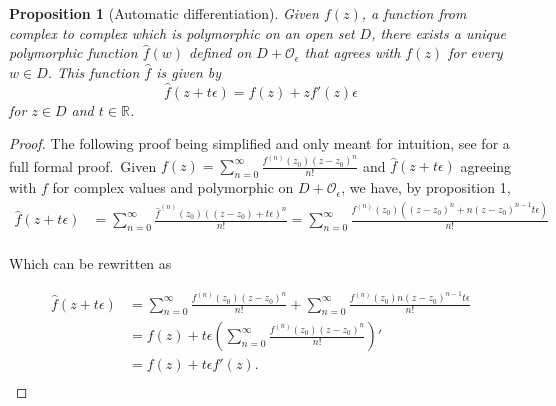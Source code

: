 \documentclass{article}
\newtheorem{proposition}[theorem]{Proposition}
\newcommand{\R}{\mathbb{R}}
\newcommand{\Z}{\mathcal{O}_\e}
\newcommand{\e}{\epsilon}
\begin{document}
\begin{proposition}[Automatic differentiation]\label{pr:auto}
        Given $f(z)$, a function from complex to complex which is polymorphic on an open set $D$, there exists a unique polymorphic function $\hat{f}(w)$ defined on $D + \Z$ that agrees with $f(z)$ for every $w \in D$. This function $\hat{f}$ is given by
\begin{equation}
        \hat{f}(z + t\e) = f(z) + z f'(z) \e
\end{equation}
for $z \in D$ and $t \in \R$.
\end{proposition}
\begin{proof}
The following proof being simplified and only meant for intuition, see \cite{messelmi2015} for a full formal proof.\ Given $f(z) = \sum_{n=0}^\infty \frac{f^{(n)}(z_0)(z-z_0)^n}{n!} $ and $\hat{f}(z+t\e)$ agreeing with $f$ for complex values and polymorphic on $D+\Z$, we have, by proposition 1,
\begin{equation}
\begin{split}
        \hat{f}(z + t \e) &= \sum_{n=0}^\infty \frac{\hat{f}^{(n)}(z_0) ((z-z_0) + t\e)^n}{n!}
                           = \sum_{n=0}^\infty \frac{f^{(n)}(z_0) ((z-z_0)^n + n(z-z_0)^{n-1}t\e)}{n!} \\
\end{split}
\end{equation}

Which can be rewritten as

\begin{equation}
\begin{split}
        \hat{f}(z + t \e) &= \sum_{n=0}^\infty \frac{f^{(n)}(z_0) (z-z_0)^n}{n!} + \sum_{n=0}^\infty \frac{f^{(n)}(z_0) n(z-z_0)^{n-1}t\e}{n!} \\
                          &= f(z) + t \e (\sum_{n=0}^\infty \frac{f^{(n)}(z_0) (z-z_0)^n}{n!})' \\
                          &= f(z) + t \e f'(z). \\
\end{split}
\end{equation}
\end{proof}
\end{document}
